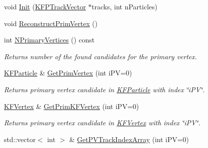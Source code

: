 \begin{DoxyCompactItemize}
\item 
void \hyperlink{classKFParticlePVReconstructor_ad11ac3f6bd43c9fcaf0b67958b41e456}{Init} (\hyperlink{classKFPTrackVector}{K\+F\+P\+Track\+Vector} $\ast$tracks, int n\+Particles)
\item 
void \hyperlink{classKFParticlePVReconstructor_aac8016012886979bbbc71f42a617ad3a}{Reconstruct\+Prim\+Vertex} ()
\item 
int \hyperlink{classKFParticlePVReconstructor_ae2a4ab31383ced56306c3b9bb08deb54}{N\+Primary\+Vertices} () const \hypertarget{classKFParticlePVReconstructor_ae2a4ab31383ced56306c3b9bb08deb54}{}\label{classKFParticlePVReconstructor_ae2a4ab31383ced56306c3b9bb08deb54}

\begin{DoxyCompactList}\small\item\em Returns number of the found candidates for the primary vertex. \end{DoxyCompactList}\item 
\hyperlink{classKFParticle}{K\+F\+Particle} \& \hyperlink{classKFParticlePVReconstructor_a8ecf4029dcd674d8baf068e1540ec413}{Get\+Prim\+Vertex} (int i\+PV=0)\hypertarget{classKFParticlePVReconstructor_a8ecf4029dcd674d8baf068e1540ec413}{}\label{classKFParticlePVReconstructor_a8ecf4029dcd674d8baf068e1540ec413}

\begin{DoxyCompactList}\small\item\em Returns primary vertex candidate in \hyperlink{classKFParticle}{K\+F\+Particle} with index \char`\"{}i\+P\+V\char`\"{}. \end{DoxyCompactList}\item 
\hyperlink{classKFVertex}{K\+F\+Vertex} \& \hyperlink{classKFParticlePVReconstructor_ab3203efd8e779ab6ad14120c97dce7f2}{Get\+Prim\+K\+F\+Vertex} (int i\+PV=0)\hypertarget{classKFParticlePVReconstructor_ab3203efd8e779ab6ad14120c97dce7f2}{}\label{classKFParticlePVReconstructor_ab3203efd8e779ab6ad14120c97dce7f2}

\begin{DoxyCompactList}\small\item\em Returns primary vertex candidate in \hyperlink{classKFVertex}{K\+F\+Vertex} with index \char`\"{}i\+P\+V\char`\"{}. \end{DoxyCompactList}\item 
std\+::vector$<$ int $>$ \& \hyperlink{classKFParticlePVReconstructor_a5fd10eaad4fef141774e7081cc9e07f9}{Get\+P\+V\+Track\+Index\+Array} (int i\+PV=0)\hypertarget{classKFParticlePVReconstructor_a5fd10eaad4fef141774e7081cc9e07f9}{}\label{classKFParticlePVReconstructor_a5fd10eaad4fef141774e7081cc9e07f9}


\end{DoxyCompactItemize}
